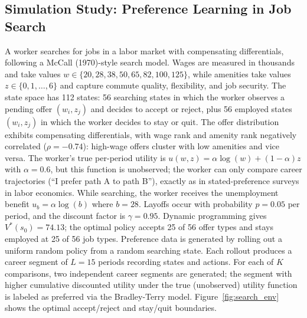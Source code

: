 \begin{table}[htbp]
\centering
\caption[Aggregator comparison at $N=2000$ comparisons per pair]{Aggregator comparison at $N = 2000$ comparisons per pair, mean and standard error over thirty seeds. PO viol. and PMC viol. are fractions of seeds on which the output ranking violates the corresponding axiom. Worst-group util. is the type-two utility of the top-ranked candidate. Modal top names the candidate most frequently ranked first.}
\label{tab:axiom_aware_aggregation}

\end{table}

\subsection{Simulation Study: Preference Learning in Job Search}

A worker searches for jobs in a labor market with compensating differentials, following a McCall (1970)-style search model. Wages are measured in thousands and take values $w \in \{20,28,38,50,65,82,100,125\}$, while amenities take values $z \in \{0, 1, \ldots, 6\}$ and capture commute quality, flexibility, and job security. The state space has 112 states: 56 searching states in which the worker observes a pending offer $(w_i, z_j)$ and decides to accept or reject, plus 56 employed states $(w_i, z_j)$ in which the worker decides to stay or quit. The offer distribution exhibits compensating differentials, with wage rank and amenity rank negatively correlated ($\rho = -0.74$): high-wage offers cluster with low amenities and vice versa. The worker's true per-period utility is $u(w, z) = \alpha \log(w) + (1 - \alpha) z$ with $\alpha = 0.6$, but this function is unobserved; the worker can only compare career trajectories (``I prefer path A to path B''), exactly as in stated-preference surveys in labor economics. While searching, the worker receives the unemployment benefit $u_b = \alpha \log(b)$ where $b = 28$. Layoffs occur with probability $p = 0.05$ per period, and the discount factor is $\gamma = 0.95$. Dynamic programming gives $V^*(s_0) = 74.13$; the optimal policy accepts 25 of 56 offer types and stays employed at 25 of 56 job types. Preference data is generated by rolling out a uniform random policy from a random searching state. Each rollout produces a career segment of $L = 15$ periods recording states and actions. For each of $K$ comparisons, two independent career segments are generated; the segment with higher cumulative discounted utility under the true (unobserved) utility function is labeled as preferred via the Bradley-Terry model. Figure~\ref{fig:search_env} shows the optimal accept/reject and stay/quit boundaries.

